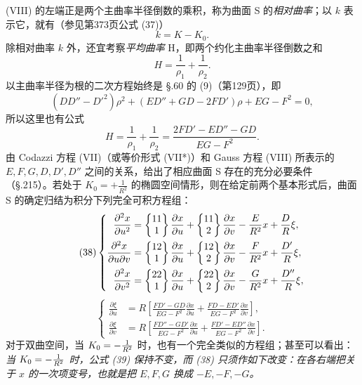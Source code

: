 (VIII) 的左端正是两个主曲率半径倒数的乘积，称为曲面 S 的\emph{相对曲率}；以 $k$ 表示它，就有（参见第373页公式 (37)）
\[
k=K-K_0.
\]
除相对曲率 $k$ 外，还宜考察\emph{平均曲率} H，即两个约化主曲率半径倒数之和
\[
H=\frac1{\rho_1}+\frac1{\rho_2}.
\]
以主曲率半径为根的二次方程始终是 \S.60 的 (9)（第129页），即
\[
(DD''-D'^2)\rho^2+(ED''+GD-2FD')\rho+EG-F^2=0,
\]
所以这里也有公式
\[
\tag{VIII*}
H=\frac1{\rho_1}+\frac1{\rho_2}=\frac{2FD'-ED''-GD}{EG-F^2}.
\]
由 Codazzi 方程 (VII)（或等价形式 (VII*)）和 Gauss 方程 (VIII) 所表示的 $E,F,G,D,D',D''$ 之间的关系，给出了相应曲面 S 存在的充分必要条件（\S.215）。若处于 $K_0=+\frac1{R^2}$ 的椭圆空间情形，则在给定前两个基本形式后，曲面 S 的确定归结为积分下列完全可积方程组：
\[
\tag{38}
\left\{
\begin{aligned}
\frac{\partial^2x}{\partial u^2}&=\left\{\begin{matrix}11\\1\end{matrix}\right\}\frac{\partial x}{\partial u}+\left\{\begin{matrix}11\\2\end{matrix}\right\}\frac{\partial x}{\partial v}-\frac{E}{R^2}x+\frac{D}{R}\xi,\\
\frac{\partial^2x}{\partial u\partial v}&=\left\{\begin{matrix}12\\1\end{matrix}\right\}\frac{\partial x}{\partial u}+\left\{\begin{matrix}12\\2\end{matrix}\right\}\frac{\partial x}{\partial v}-\frac{F}{R^2}x+\frac{D'}{R}\xi,\\
\frac{\partial^2x}{\partial v^2}&=\left\{\begin{matrix}22\\1\end{matrix}\right\}\frac{\partial x}{\partial u}+\left\{\begin{matrix}22\\2\end{matrix}\right\}\frac{\partial x}{\partial v}-\frac{G}{R^2}x+\frac{D''}{R}\xi,
\end{aligned}\right.
\]
\[
\tag{39}
\left\{
\begin{aligned}
\frac{\partial\xi}{\partial u}&=R\left[\frac{FD'-GD}{EG-F^2}\frac{\partial x}{\partial u}+\frac{FD-ED'}{EG-F^2}\frac{\partial x}{\partial v}\right],\\
\frac{\partial\xi}{\partial v}&=R\left[\frac{FD''-GD'}{EG-F^2}\frac{\partial x}{\partial u}+\frac{FD'-ED''}{EG-F^2}\frac{\partial x}{\partial v}\right].
\end{aligned}\right.
\]
对于双曲空间，当 $K_0=-\frac1{R^2}$ 时，也有一个完全类似的方程组；甚至可以看出：\emph{当 $K_0=-\frac1{R^2}$ 时，公式 (39) 保持不变，而 (38) 只须作如下改变：在各右端把关于 $x$ 的一次项变号，也就是把 $E,F,G$ 换成 $-E,-F,-G$。}

